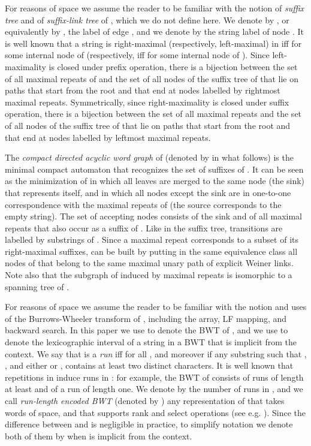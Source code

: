 \documentclass[a4paper,UKenglish]{lipics-v2016}
\begin{document}
For reasons of space we assume the reader to be familiar with the notion of \emph{suffix tree}  and of \emph{suffix-link tree} of , which we do not define here. We denote by , or equivalently by , the label of edge , and we denote by  the string label of node . It is well known that a string  is right-maximal (respectively, left-maximal) in  iff  for some internal node  of  (respectively, iff  for some internal node  of ). Since left-maximality is closed under prefix operation, there is a bijection between the set of all maximal repeats of  and the set of all nodes of the suffix tree of  that lie on paths that start from the root and that end at nodes labelled by rightmost maximal repeats. Symmetrically, since right-maximality is closed under suffix operation, there is a bijection between the set of all maximal repeats and the set of all nodes of the suffix tree of  that lie on paths that start from the root and that end at nodes labelled by leftmost maximal repeats.





The \emph{compact directed acyclic word graph} of  (denoted by  in what follows) is the minimal compact automaton that recognizes the set of suffixes of  \cite{blumer1987complete,CrochemoreV97}. It can be seen as the minimization of  in which all leaves are merged to the same node (the sink) that represents  itself, and in which all nodes except the sink are in one-to-one correspondence with the maximal repeats of  \cite{Raffinot2001} (the source corresponds to the empty string). The set of accepting nodes consists of the sink and of all maximal repeats that also occur as a suffix of . Like in the suffix tree, transitions are labelled by substrings of . Since a maximal repeat corresponds to a subset of its right-maximal suffixes,  can be built by putting in the same equivalence class all nodes of  that belong to the same maximal unary path of explicit Weiner links. Note also that the subgraph of  induced by maximal repeats is isomorphic to a spanning tree of .

For reasons of space we assume the reader to be familiar with the notion and uses of the Burrows-Wheeler transform of , including the  array, LF mapping, and backward search. In this paper we use  to denote the BWT of , and we use  to denote the lexicographic interval of a string  in a BWT that is implicit from the context. We say that  is a \emph{run} iff  for all , and moreover if any substring  such that , , and either  or , contains at least two distinct characters. It is well known that repetitions in  induce runs in : for example, the BWT of  consists of  runs of length at least  and of a run of length one. We denote by  the number of runs in , and we call \emph{run-length encoded BWT} (denoted by ) any representation of  that takes  words of space, and that supports rank and select operations (see e.g. \cite{makinen2005succinct1,MakinenNSV10,SirenVMN08}). Since the difference between  and  is negligible in practice, to simplify notation we denote both of them by  when  is implicit from the context.
\end{document}
